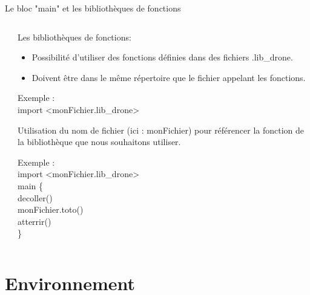 \documentclass{bredelebeamer}
\begin{document}
\begin{frame}{Le bloc "main" et les bibliothèques de fonctions}
\begin{columns}
\begin{column}{0.5\textwidth}
\begin{tabbing}
\end{tabbing}	
\end{column}
\begin{column}{0.5\textwidth}
Les bibliothèques de fonctions:\\
\begin{itemize}
\item Possibilité d'utiliser des fonctions définies dans des fichiers .lib\_drone.
\item Doivent être dans le même répertoire que le fichier appelant les fonctions.
\end{itemize}\pause
\begin{tabbing}
Exemple :\=\\
            \>\color{Framarouge}import <\color{black}monFichier.lib\_drone\color{Framarouge}>\pause
\end{tabbing}		
\vspace{10px}
Utilisation du nom de fichier (ici : \color{Framarouge}monFichier\color{black}) pour référencer la fonction de la bibliothèque que nous souhaitons utiliser.
\begin{tabbing}
Exemple :\=\\
            \>\color{Framarouge}import <\color{black}monFichier.lib\_drone\color{Framarouge}>\\
	    	\>\color{Framarouge}main  \{\=\\ 
	\>\>\color{Framarouge}decoller()\\
	\>\>\color{black}monFichier.toto()\\ 
	\>\>\color{Framarouge}atterrir()\\
	\>\color{Framarouge}\}\\
\end{tabbing}


\end{column}
\end{columns}

\end{frame}



\section{Environnement}
\end{document}
